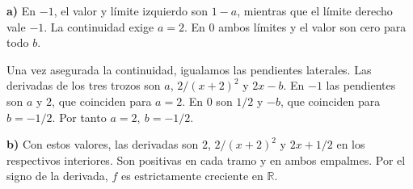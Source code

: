 \textbf{a)} En $-1$, el valor y límite izquierdo son $1-a$,
mientras que el límite derecho vale $-1$. La continuidad exige
$a=2$. En $0$ ambos límites y el valor son cero para todo $b$.

Una vez asegurada la continuidad, igualamos las pendientes laterales.
Las derivadas de los tres trozos son $a$, $2/(x+2)^2$ y $2x-b$.
En $-1$ las pendientes son $a$ y $2$, que coinciden para $a=2$.
En $0$ son $1/2$ y $-b$, que coinciden para $b=-1/2$.
Por tanto $\boxed{a=2,\ b=-1/2}$.

\textbf{b)} Con estos valores, las derivadas son $2$,
$2/(x+2)^2$ y $2x+1/2$ en los respectivos interiores.
Son positivas en cada tramo y en ambos empalmes. Por el signo de
la derivada, $f$ es $\boxed{\text{estrictamente creciente en }\mathbb R}$.
